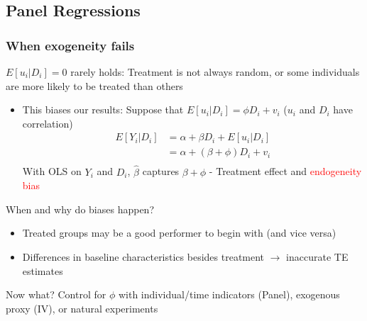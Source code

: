 \documentclass[aspectratio=169]{beamer}
\newenvironment{wideitemize}{\itemize\addtolength{\itemsep}{10pt}}{\enditemize}
\begin{document}
\subsection{Panel Regressions}
\begin{frame}
\frametitle{When exogeneity fails} 
\begin{wideitemize}
\item  $E[u_i|D_i]=0$ rarely holds: Treatment is not always random, or some individuals are more likely to be treated than others
\begin{itemize}
\item This biases our results: Suppose that $E[u_i|D_i]=\phi D_i + v_i$ ($u_i$ and $D_i$ have correlation)
 \[
 \begin{aligned}
  E[Y_i|D_i]&=\alpha+\beta D_i+E[u_i|D_i]\\
  &=\alpha + (\beta+\phi)D_i + v_i\\
 \end{aligned}
\]
With OLS on $Y_i$ and $D_i$, $\hat{\beta}$ captures $\beta+\phi$ - Treatment effect and \textcolor{red}{endogeneity bias}
\end{itemize}
\item When and why do biases happen?
\begin{itemize}
\item Treated groups may be a good performer to begin with (and vice versa)
\item Differences in baseline characteristics besides treatment $\to$ inaccurate TE estimates
\end{itemize}
\item Now what? Control for $\phi$ with individual/time indicators (Panel), exogenous proxy (IV), or natural experiments
\end{wideitemize}
\end{frame}
\end{document}
